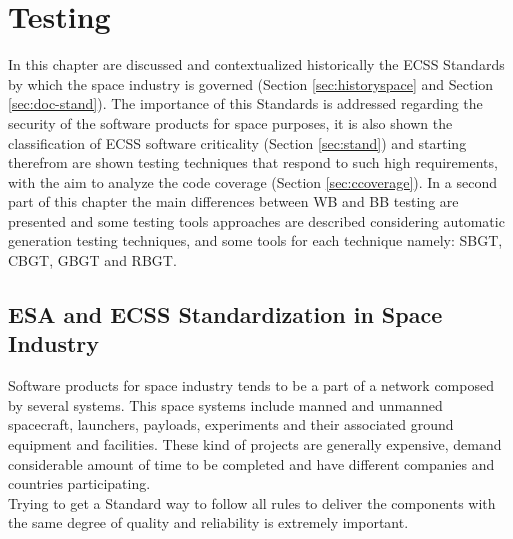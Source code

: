 \chapter{Testing}
\minitoc
In this chapter are discussed and contextualized historically the \ac{ECSS} Standards by which the space industry is governed (Section \ref{sec:historyspace} and Section \ref{sec:doc-stand}).
The importance of this Standards is addressed regarding the security of the software products for space purposes, it is also
shown the classification of \ac{ECSS} software criticality (Section \ref{sec:stand}) and starting therefrom are shown testing techniques that 
respond to such high requirements, with the aim to analyze the code coverage (Section \ref{sec:ccoverage}).
In a second part of this chapter the main differences between \ac{WB} and \ac{BB} testing are presented and
some testing tools approaches are described considering automatic generation testing techniques, and some tools for each technique namely:
\ac{SBGT}, \ac{CBGT}, \ac{GBGT} and
\ac{RBGT}.
\section{ESA and ECSS Standardization in Space Industry}
Software products for space industry tends to be a part of a network composed by several systems. This space systems include manned and unmanned spacecraft,
launchers, payloads, experiments and their associated ground equipment and facilities\cite{Mattiello-FranciscoSanAmbJogCos:2007:BrSoIn}.
These kind of projects are generally  expensive, demand considerable amount of time to be completed and have different companies and countries participating.\\
Trying to get a Standard way to follow all rules to deliver the components with the same degree of quality and reliability is extremely important.\\


